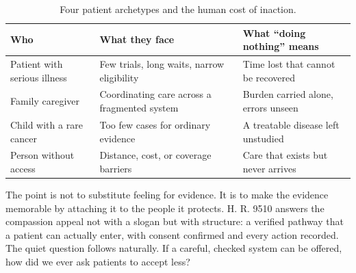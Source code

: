 \begin{table}[H]
\footnotesize
\begin{tabularx}{\textwidth}{@{}L{4cm} Y L{5.3cm}@{}}
\toprule
\textbf{Who} & \textbf{What they face} & \textbf{What ``doing nothing'' means}\\
\midrule
Patient with serious illness & Few trials, long waits, narrow eligibility & Time lost that cannot be recovered\\
Family caregiver & Coordinating care across a fragmented system & Burden carried alone, errors unseen\\
Child with a rare cancer & Too few cases for ordinary evidence & A treatable disease left unstudied\\
Person without access & Distance, cost, or coverage barriers & Care that exists but never arrives\\
\bottomrule
\end{tabularx}
\caption{Four patient archetypes and the human cost of inaction.}
\label{tab:compassion}
\end{table}

The point is not to substitute feeling for evidence. It is to make the evidence
memorable by attaching it to the people it protects. H. R. 9510 answers the
compassion appeal not with a slogan but with structure: a verified pathway that a
patient can actually enter, with consent confirmed and every action recorded. The
quiet question follows naturally. If a careful, checked system can be offered, how
did we ever ask patients to accept less?
